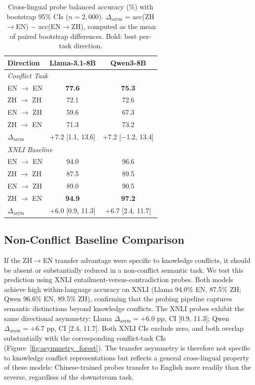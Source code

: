 \begin{table}[t]
\centering
\caption{Cross-lingual probe balanced accuracy (\%) with bootstrap 95\% CIs ($n = 2{,}000$). $\Delta_{\text{asym}}$ = acc(ZH$\to$EN) $-$ acc(EN$\to$ZH), computed as the mean of paired bootstrap differences. Bold: best per-task direction.}
\label{tab:main_results}
\begin{tabular}{lcc}
\toprule
Direction & Llama-3.1-8B & Qwen3-8B \\
\midrule
\multicolumn{3}{l}{\textit{Conflict Task}} \\
EN $\to$ EN & \textbf{77.6} & \textbf{75.3} \\
ZH $\to$ ZH & 72.1 & 72.6 \\
EN $\to$ ZH & 59.6 & 67.3 \\
ZH $\to$ EN & 71.3 & 73.2 \\
$\Delta_{\text{asym}}$ & +7.2 [1.1, 13.6] & +7.2 [$-$1.2, 13.4] \\
\midrule
\multicolumn{3}{l}{\textit{XNLI Baseline}} \\
EN $\to$ EN & 94.0 & 96.6 \\
ZH $\to$ ZH & 87.5 & 89.5 \\
EN $\to$ ZH & 89.0 & 90.5 \\
ZH $\to$ EN & \textbf{94.9} & \textbf{97.2} \\
$\Delta_{\text{asym}}$ & +6.0 [0.9, 11.3] & +6.7 [2.4, 11.7] \\
\bottomrule
\end{tabular}
\end{table}

\subsection{Non-Conflict Baseline Comparison}
\label{sec:xnli_baseline}

If the ZH$\to$EN transfer advantage were specific to knowledge conflicts, it should be absent or substantially reduced in a non-conflict semantic task.
We test this prediction using XNLI entailment-versus-contradiction probes.
Both models achieve high within-language accuracy on XNLI (Llama 94.0\% EN, 87.5\% ZH; Qwen 96.6\% EN, 89.5\% ZH), confirming that the probing pipeline captures semantic distinctions beyond knowledge conflicts.
The XNLI probes exhibit the same directional asymmetry: Llama $\Delta_{\text{asym}} = +6.0$ pp, CI [0.9, 11.3]; Qwen $\Delta_{\text{asym}} = +6.7$ pp, CI [2.4, 11.7].
Both XNLI CIs exclude zero, and both overlap substantially with the corresponding conflict-task CIs (Figure~\ref{fig:asymmetry_forest}).
The transfer asymmetry is therefore not specific to knowledge conflict representations but reflects a general cross-lingual property of these models: Chinese-trained probes transfer to English more readily than the reverse, regardless of the downstream task.

